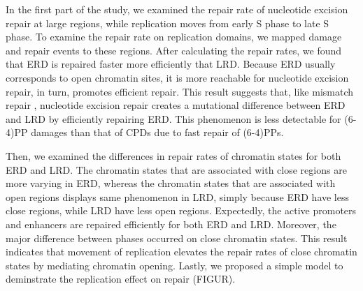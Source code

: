 In the first part of the study, we examined the repair rate of nucleotide excision repair at large regions, while replication moves from early S phase to late S phase. To examine the repair rate on replication domains, we mapped damage and repair events to these regions. After calculating the repair rates, we found that ERD is repaired faster more efficiently that LRD. Because ERD usually corresponds to open chromatin sites, it is more reachable for nucleotide excision repair, in turn, promotes efficient repair. This result suggests that, like mismatch repair \citep{supek2015differential}, nucleotide excision repair creates a mutational difference between ERD and LRD by efficiently repairing ERD. This phenomenon is less detectable for (6-4)PP damages than that of CPDs due to fast repair of (6-4)PPs.

Then, we examined the differences in repair rates of chromatin states for both ERD and LRD. The chromatin states that are associated with close regions are more varying in ERD, whereas the chromatin states that are associated with open regions displays same phenomenon in LRD, simply because ERD have less close regions, while LRD have less open regions. Expectedly, the active promoters and enhancers are repaired efficiently for both ERD and LRD. Moreover, the major difference between phases occurred on close chromatin states. This result indicates that movement of replication elevates the repair rates of close chromatin states by mediating chromatin opening. Lastly, we proposed a simple model to deminstrate the replication effect on repair (FIGUR).     

